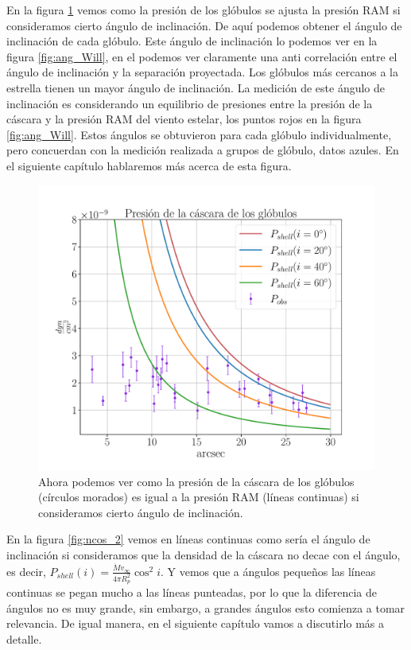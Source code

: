 \documentclass{book}
\begin{document}
En la figura \ref{graf_presion_ang} vemos como la presión de los glóbulos se ajusta la presión RAM si consideramos cierto ángulo de inclinación. De aquí podemos obtener el ángulo de inclinación de cada glóbulo. Este ángulo de inclinación lo podemos ver en la figura \ref{fig:ang_Will}, en el podemos ver claramente una anti correlación entre el ángulo de inclinación y la separación proyectada. Los glóbulos más cercanos a la estrella tienen un mayor ángulo de inclinación. La medición de este ángulo de inclinación es considerando un equilibrio de presiones entre la presión de la cáscara y la presión RAM del viento estelar, los puntos rojos en la figura \ref{fig:ang_Will}. Estos ángulos se obtuvieron para cada glóbulo individualmente, pero concuerdan con la medición realizada a grupos de glóbulo, datos azules. En el siguiente capítulo hablaremos más acerca de esta figura.

\begin{figure}[htb]
    \centering
    \includegraphics[width=\textwidth]{ultimos/R_1_.pdf}
    \caption{Ahora podemos ver como la presión de la cáscara de los glóbulos (círculos morados) es igual a la presión RAM (líneas continuas) si consideramos cierto ángulo de inclinación.}
    \label{graf_presion_ang}
\end{figure}

En la figura \ref{fig:ncos_2} vemos en líneas continuas como sería el ángulo de inclinación si consideramos que la densidad de la cáscara no decae con el ángulo, es decir, $P_{shell}(i)=\frac{\dot{M}v_\infty}{4\pi R_p^2}\cos^2i$. Y vemos que a ángulos pequeños las líneas continuas se pegan mucho a las líneas punteadas, por lo que la diferencia de ángulos no es muy grande, sin embargo, a grandes ángulos esto comienza a tomar relevancia. De igual manera, en el siguiente capítulo vamos a discutirlo más a detalle.
\end{document}
